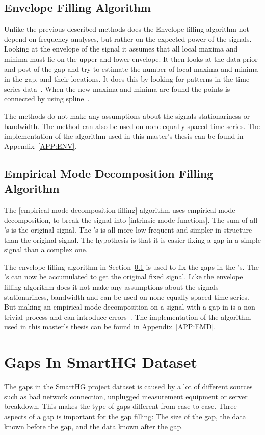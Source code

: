 \subsection{Envelope Filling Algorithm}
\label{T:EGA}
Unlike the previous described methods does the Envelope filling algorithm not depend on frequency analyses, but rather on the expected power of the signals. Looking at the envelope of the signal it assumes that all local maxima and minima must lie on the upper and lower envelope. It then looks at the data prior and post of the gap and try to estimate the number of local maxima and minima in the gap, and their locations. It does this by looking for patterns in the time series data~\citep{RefWorks:6}. When the new maxima and minima are found the points is connected by using spline~\cite{RefWorks:16}. 

The methods do not make any assumptions about the signals stationariness or bandwidth. The method can also be used on none equally spaced time series. The implementation of the algorithm used in this master's thesis can be found in Appendix~\ref{APP:ENV}.

\subsection{Empirical Mode Decomposition Filling Algorithm}
The [empirical mode decomposition filling] algorithm uses empirical mode decomposition, to break the signal into [intrinsic mode functions]. The sum of all 's is the original signal. The 's is all more low frequent and simpler in structure than the original signal. The hypothesis is that it is easier fixing a gap in a simple signal than a complex one. 

The envelope filling algorithm in Section~\ref{T:EGA} is used to fix the gaps in the 's. The 's can now be accumulated to get the original fixed signal. Like the envelope filling algorithm does it not make any assumptions about the signals stationariness, bandwidth and can be used on none equally spaced time series. But making an empirical mode decomposition on a signal with a gap in is a non-trivial process and can introduce errors~\citep{RefWorks:16}. The implementation of the algorithm used in this master's thesis can be found in Appendix~\ref{APP:EMD}.

\section{Gaps In SmartHG Dataset}
The gaps in the SmartHG project dataset is caused by a lot of different sources such as bad network connection, unplugged measurement equipment or server breakdown. This makes the type of gaps different from case to case. Three aspects of a gap is important for the gap filling: The size of the gap, the data known before the gap, and the data known after the gap. 

